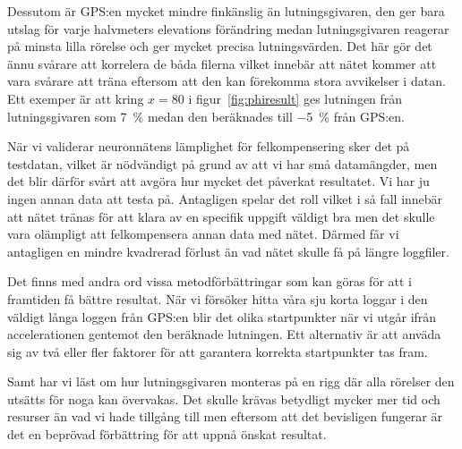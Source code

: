 {Dessutom är GPS:en mycket mindre finkänslig än lutningsgivaren, den ger bara
utslag för varje halvmeters elevations förändring medan lutningsgivaren reagerar
på minsta lilla rörelse och ger mycket precisa lutningsvärden.
Det här gör det ännu svårare att korrelera de båda filerna vilket innebär att
nätet kommer att vara svårare att träna eftersom att den kan förekomma stora
avvikelser i datan.
Ett exemper är att kring $x = 80$ i figur~\ref{fig:phiresult} ges
lutningen från lutningsgivaren som \SI{7}{\percent} medan den beräknades till
\SI{-5}{\percent} från GPS:en.

När vi validerar neuronnätens lämplighet för felkompensering sker det på testdatan,
vilket är nödvändigt på grund av att vi har små datamängder, men det blir därför
svårt att avgöra hur mycket det påverkat resultatet.
Vi har ju ingen annan data att testa på.
Antagligen spelar det roll vilket i så fall innebär att nätet tränas för att
klara av en specifik uppgift väldigt bra men det skulle vara olämpligt att
felkompensera annan data med nätet.
Därmed får vi antagligen en mindre kvadrerad förlust än vad nätet skulle få på
längre loggfiler.

Det finns med andra ord vissa metodförbättringar som kan göras för att i
framtiden få bättre resultat.
När vi försöker hitta våra sju korta loggar i den väldigt långa loggen från
GPS:en blir det olika startpunkter när vi utgår ifrån accelerationen
gentemot den beräknade lutningen.
Ett alternativ är att anväda sig av två eller fler faktorer för
att garantera korrekta startpunkter tas fram.

Samt har vi läst om hur lutningsgivaren monteras på en rigg där alla rörelser
den utsätts för noga kan övervakas. Det skulle krävas betydligt mycker mer tid
och resurser än vad vi hade tillgång till men eftersom att det bevisligen
fungerar är det en beprövad förbättring för att uppnå önskat resultat.
}
